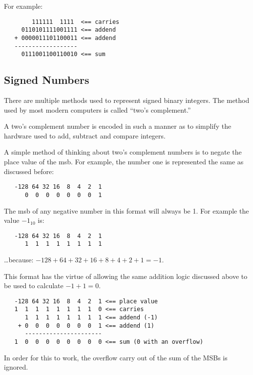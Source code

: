 For example:

\begin{verbatim}
        111111  1111  <== carries
     0110101111001111 <== addend
   + 0000011101100011 <== addend
   ------------------
     0111001100110010 <== sum
\end{verbatim}

\subsection{Signed Numbers}

There are multiple methods used to represent signed binary integers.
The method used by most modern computers is called ``two's complement.''

A two's complement number is encoded in such a manner as to simplify
the hardware used to add, subtract and compare integers.  

A simple method of thinking about two's complement numbers is to
negate the place value of the \acrshort{msb}.  For example, the 
number one is represented the same as discussed before:

\begin{verbatim}
   -128 64 32 16  8  4  2  1
      0  0  0  0  0  0  0  1
\end{verbatim}

The \acrshort{msb} of any negative number in this format will always
be 1.  For example the value $-1_{10}$ is:

\begin{verbatim}
   -128 64 32 16  8  4  2  1
      1  1  1  1  1  1  1  1
\end{verbatim}

\ldots because: $-128+64+32+16+8+4+2+1=-1$.

This format has the virtue of allowing the same addition logic 
discussed above to be used to calculate $-1+1=0$.

\begin{verbatim}
   -128 64 32 16  8  4  2  1 <== place value
   1  1  1  1  1  1  1  1  0 <== carries
      1  1  1  1  1  1  1  1 <== addend (-1)
    + 0  0  0  0  0  0  0  1 <== addend (1)
      ----------------------
   1  0  0  0  0  0  0  0  0 <== sum (0 with an overflow)
\end{verbatim}

In order for this to work, the \gls{overflow} carry out of the 
sum of the MSBs is ignored.

